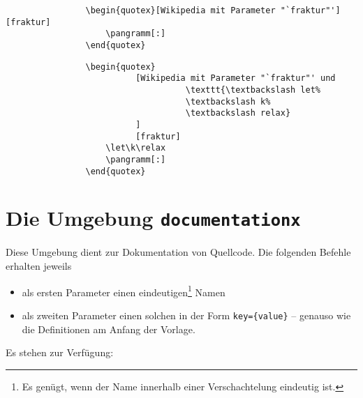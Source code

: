 			\begin{verbatim}
				\begin{quotex}[Wikipedia mit Parameter "`fraktur"'][fraktur]
				    \pangramm[:]
				\end{quotex}
			\end{verbatim}


			\begin{verbatim}
				\begin{quotex}
				          [Wikipedia mit Parameter "`fraktur"' und
					                \texttt{\textbackslash let%
					                \textbackslash k%
					                \textbackslash relax}
					      ]
				          [fraktur]
				    \let\k\relax
				    \pangramm[:]
				\end{quotex}
			\end{verbatim}







		\section{Die Umgebung \texttt{documentationx}}
			Diese Umgebung dient zur Dokumentation von Quellcode.
			Die folgenden Befehle erhalten jeweils
			\begin{itemize}
				\item als ersten Parameter einen eindeutigen\footnote{Es genügt, wenn der Name innerhalb einer Verschachtelung eindeutig ist.} Namen
				\item als zweiten Parameter einen solchen in der Form \verb|key={value}| -- genauso wie die Definitionen am Anfang der Vorlage.
			\end{itemize}
			Es stehen zur Verfügung:

